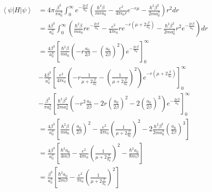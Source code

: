 \documentclass[12pt]{article}
\begin{document}
\begin{equation*}
    \begin{split}
        \left\langle \psi \left| H \right| \psi\right\rangle & = 4\pi \frac{\beta^3}{\pi a_0^3} \int_0^\infty e^{-\frac{2 r \beta}{a_0}} \left(\frac{\hbar^2 \beta}{m r a_0} - \frac{e^2}{4 \pi \epsilon_0 r} e^{-r\mu} - \frac{\hbar^2 \beta^2}{2m a_0^2} \right)r^2 dr                                                  \\
                                                             & = \frac{4\beta^3}{a_0^3} \int_0^\infty \left(\frac{\hbar^2 \beta}{m a_0} r e^{-\frac{2 r \beta}{a_0}} - \frac{e^2}{4 \pi \epsilon_0}r e^{-r(\mu+2 \frac{\beta}{a_0})} - \frac{\hbar^2 \beta^2}{2m a_0^2} r^2 e^{-\frac{2 r \beta}{a_0}}\right) dr          \\
                                                             & = \frac{4\beta^3}{a_0^3}\left[ \frac{\hbar^2 \beta}{m a_0}
            \left(- r\frac{a_0}{2 \beta} - \left(\frac{a_0}{2 \beta}\right)^2 \right) e^{-\frac{2 r \beta}{a_0}} \right]_0^\infty
        \\ &
        - \frac{4\beta^3}{a_0^3}\left[ \frac{e^2}{4 \pi \epsilon_0} \left(-r \frac{1}{\mu+2\frac{\beta}{a_0}} - \left(\frac{1}{\mu+2\frac{\beta}{a_0}}\right)^2\right)e^{-r(\mu+2\frac{\beta}{a_0})} \right]_0^\infty                                                                                                     \\ &
        - \frac{\beta^3}{\pi a_0^3}\left[ \frac{\hbar^2 \beta^2}{2m a_0^2} \left(- r^2 \frac{a_0}{2 \beta} -  2r \left(\frac{a_0}{2 \beta} \right)^2 - 2 \left(\frac{a_0}{2 \beta}\right)^3 \right) e^{-\frac{2 r \beta}{a_0}} \right]_0^\infty                                                                           \\
                                                             & = \frac{4\beta^3}{a_0^3} \left[\frac{\hbar^2 \beta}{m a_0}\left(\frac{a_0}{2 \beta}\right)^2 - \frac{e^2}{4 \pi \epsilon_0}\left(\frac{1}{\mu+2\frac{\beta}{a_0}}\right)^2 - 2 \frac{\hbar^2 \beta^2}{2m a_0^2} \left(\frac{a_0}{2 \beta}\right)^3 \right] \\
                                                             & = \frac{4\beta^3}{a_0^3} \left[\frac{\hbar^2 a_0}{4m \beta} - \frac{e^2}{4 \pi \epsilon_0}\left(\frac{1}{\mu+2\frac{\beta}{a_0}}\right)^2 - \frac{\hbar^2 a_0}{8m \beta} \right]                                                                           \\
                                                             & = \frac{\beta^3}{a_0^3} \left[\frac{\hbar^2 a_0}{2m \beta} - \frac{e^2}{\pi \epsilon_0}\left(\frac{1}{\mu+2\frac{\beta}{a_0}}\right)^2 \right]
    \end{split}
\end{equation*}
\end{document}
